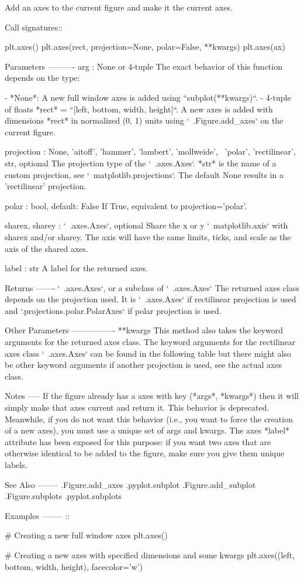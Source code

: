 \begin{DoxyVerb}Add an axes to the current figure and make it the current axes.

Call signatures::

    plt.axes()
    plt.axes(rect, projection=None, polar=False, **kwargs)
    plt.axes(ax)

Parameters
----------
arg : None or 4-tuple
    The exact behavior of this function depends on the type:

    - *None*: A new full window axes is added using
      ``subplot(**kwargs)``.
    - 4-tuple of floats *rect* = ``[left, bottom, width, height]``.
      A new axes is added with dimensions *rect* in normalized
      (0, 1) units using `~.Figure.add_axes` on the current figure.

projection : {None, 'aitoff', 'hammer', 'lambert', 'mollweide', \
'polar', 'rectilinear', str}, optional
    The projection type of the `~.axes.Axes`. *str* is the name of
    a custom projection, see `~matplotlib.projections`. The default
    None results in a 'rectilinear' projection.

polar : bool, default: False
    If True, equivalent to projection='polar'.

sharex, sharey : `~.axes.Axes`, optional
    Share the x or y `~matplotlib.axis` with sharex and/or sharey.
    The axis will have the same limits, ticks, and scale as the axis
    of the shared axes.

label : str
    A label for the returned axes.

Returns
-------
`~.axes.Axes`, or a subclass of `~.axes.Axes`
    The returned axes class depends on the projection used. It is
    `~.axes.Axes` if rectilinear projection is used and
    `.projections.polar.PolarAxes` if polar projection is used.

Other Parameters
----------------
**kwargs
    This method also takes the keyword arguments for
    the returned axes class. The keyword arguments for the
    rectilinear axes class `~.axes.Axes` can be found in
    the following table but there might also be other keyword
    arguments if another projection is used, see the actual axes
    class.


Notes
-----
If the figure already has a axes with key (*args*,
*kwargs*) then it will simply make that axes current and
return it.  This behavior is deprecated. Meanwhile, if you do
not want this behavior (i.e., you want to force the creation of a
new axes), you must use a unique set of args and kwargs.  The axes
*label* attribute has been exposed for this purpose: if you want
two axes that are otherwise identical to be added to the figure,
make sure you give them unique labels.

See Also
--------
.Figure.add_axes
.pyplot.subplot
.Figure.add_subplot
.Figure.subplots
.pyplot.subplots

Examples
--------
::

    # Creating a new full window axes
    plt.axes()

    # Creating a new axes with specified dimensions and some kwargs
    plt.axes((left, bottom, width, height), facecolor='w')
\end{DoxyVerb}
